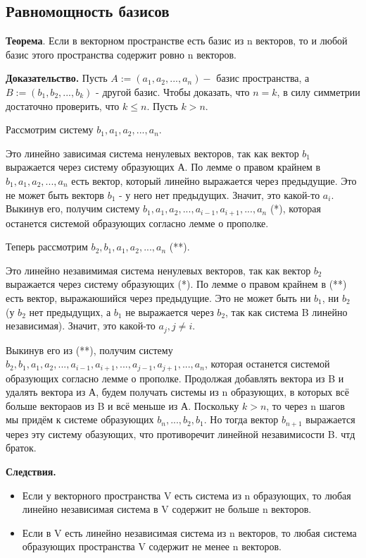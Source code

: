 \documentclass[a4paper]{article}
\begin{document}
\subsection*{Равномощность базисов}

\begin{htheorem}
\textbf{Теорема}. Если в векторном пространстве есть базис из n векторов, то и любой базис этого пространства содержит ровно n векторов.
\end{htheorem}

\begin{hproof}
\textbf{Доказательство.} Пусть $A := (a_1, a_2, ..., a_n) - $ базис пространства, а $B := (b_1, b_2, ..., b_k)$ - другой базис. Чтобы доказать, что $n=k$, в силу симметрии достаточно проверить, что $k \leq n$. Пусть $k > n$.

Рассмотрим систему $b_1, a_1, a_2, ..., a_n$.

Это линейно зависимая система ненулевых векторов, так как вектор $b_1$ выражается через систему образующих А. По лемме о правом крайнем в $b_1, a_1, a_2, ..., a_n$ есть вектор, который линейно выражается через предыдущие. Это не может быть векторв $b_1$ - у него нет предыдущих. Значит, это какой-то $a_i$. Выкинув его, получим систему $b_1, a_1, a_2, ..., a_{i-1}, a_{i+1}, ..., a_n $ (*), которая останется системой образующих согласно лемме о прополке.

Теперь рассмотрим $b_2, b_1, a_1, a_2, ..., a_n$ (**).

Это линейно незавимимая система ненулевых векторов, так как вектор $b_2$ выражается через систему образующих (*). По лемме о правом крайнем в (**) есть вектор, выражаюшийся через предыдущие. Это не может быть ни $b_1$, ни $b_2$ (у $b_2$ нет предыдущих, а $b_1$ не выражается через $b_2$, так как система B линейно независимая). Значит, это какой-то $a_j, j \neq i$.

Выкинув его из (**), получим систему $b_2, b_1, a_1, a_2, ..., a_{i-1}, a_{i+1}, ..., a_{j-1}, a_{j+1}, ...,a_n$, которая останется системой образующих согласно лемме о прополке. Продолжая добавлять вектора из B и удалять вектора из А, будем получать системы из n образующих, в которых всё больше вектораов из B и всё меньше из А. Поскольку $k>n$, то через n шагов мы придём к системе образующих $b_n, ..., b_2, b_1$. Но тогда вектор $b_{n+1}$ выражается через эту систему обазующих, что противоречит линейной незавимисости B. чтд браток.
\end{hproof}

\begin{htheorem}
\textbf{Следствия.}
\begin{itemize}
\item Если у векторного пространства V есть система из n образующих, то любая линейно независимая система в V содержит не больше n векторов.
\item  Если в V есть линейно независимая система из n векторов, то любая система образующих пространства V содержит не менее n векторов.
\end{itemize}
\end{htheorem}
\end{document}
